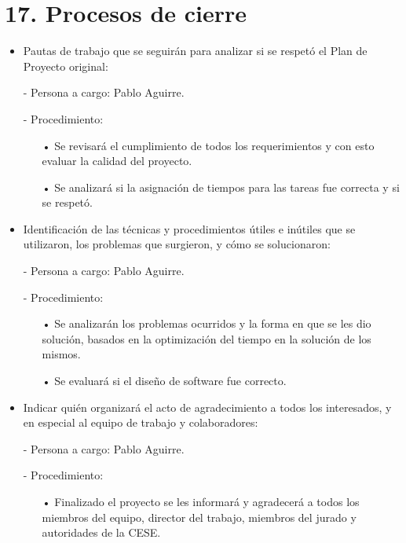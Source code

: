 \documentclass[11pt]{charter}
\begin{document}
\section{17. Procesos de cierre}    
\label{sec:cierre}

\begin{itemize}
\item Pautas de trabajo que se seguirán para analizar si se respetó el Plan de Proyecto original:

 - Persona a cargo: Pablo Aguirre.
 
 - Procedimiento:
 \begin{itemize}
 \item[•] Se revisará el cumplimiento de todos los requerimientos y con esto evaluar la calidad del proyecto.
 \item[•] Se analizará si la asignación de tiempos para las tareas fue correcta y si se respetó.
 \end{itemize}

\item Identificación de las técnicas y procedimientos útiles e inútiles que se utilizaron, los problemas que surgieron, y cómo se solucionaron:

 - Persona a cargo: Pablo Aguirre.
 
 - Procedimiento:
 \begin{itemize}
 \item[•] Se analizarán los problemas ocurridos y la forma en que se les dio solución, basados en la optimización del tiempo en la solución de los mismos.
 \item[•] Se evaluará si el diseño de software fue correcto.
 \end{itemize}
 
 \item Indicar quién organizará el acto de agradecimiento a todos los interesados, y en especial al equipo de trabajo y colaboradores:
 
 - Persona a cargo: Pablo Aguirre.
 
 - Procedimiento:
 \begin{itemize}
 \item[•] Finalizado el proyecto se les informará y agradecerá a todos los miembros del equipo, director del trabajo, miembros del jurado y autoridades de la CESE.
 \end{itemize}

\end{itemize}
\end{document}
